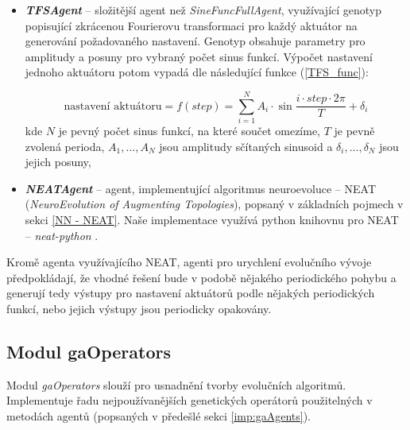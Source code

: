 \begin{itemize}
    \item \textbf{\emph{TFSAgent}} -- složitější agent než \emph{SineFuncFullAgent},
        využívající genotyp popisující zkrácenou Fourierovu transformaci pro
        každý aktuátor na generování požadovaného nastavení. Genotyp obsahuje
        parametry pro amplitudy a posuny pro vybraný počet sinus funkcí.
        Výpočet nastavení jednoho aktuátoru potom vypadá dle následující
        funkce (\ref{TFS_func}):

        \begin{equation}
            \text{nastavení aktuátoru} = f(step) = \sum_{i=1}^{N}A_i\cdot\sin\frac{i\cdot
            step\cdot2\pi}{T} + \delta_i
            \label{TFS_func}
        \end{equation}
        kde $N$ je pevný počet sinus funkcí, na které součet omezíme, $T$ je
        pevně zvolená perioda, $A_1,...,A_N$ jsou amplitudy sčítaných
        sinusoid a $\delta_i,...,\delta_N$ jsou jejich posuny,
    \item \textbf{\emph{NEATAgent}} -- agent, implementující algoritmus
        neuroevoluce -- NEAT (\emph{NeuroEvolution of Augmenting Topologies}),
        popsaný v základních pojmech v sekci \ref{NN - NEAT}. Naše implementace
        využívá python knihovnu pro NEAT -- \emph{neat-python}
        \citep{McIntyre_neat-python}.
\end{itemize}

Kromě agenta využívajícího NEAT, agenti pro urychlení evolučního vývoje
předpokládají, že vhodné řešení bude v podobě nějakého periodického pohybu a
generují tedy výstupy pro nastavení aktuátorů podle nějakých periodických
funkcí, nebo jejich výstupy jsou periodicky opakovány. 

\subsection{Modul gaOperators} \label{imp:gaOperators}
Modul \emph{gaOperators} slouží pro usnadnění tvorby evolučních algoritmů.
Implementuje řadu nejpoužívanějších genetických operátorů použitelných v
metodách agentů (popsaných v předešlé sekci \ref{imp:gaAgents}). 

